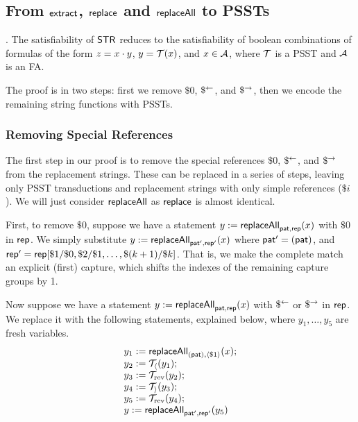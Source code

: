 \subsection{From $\mathsf{extract}$, $\mathsf{replace}$ and $\mathsf{replaceAll}$ to PSSTs}\label{appendix:sec-extract-replace-to-psst}

.
    The satisfiability of $\mathsf{STR}$ reduces to the satisfiability of boolean combinations of formulas of the form $z=x \cdot y$, $y=\mathcal{T}(x)$, and $x \in \mathcal{A}$, where $\mathcal{T}$ is a PSST and $\mathcal{A}$ is an FA.

    The proof is in two steps: first we remove $\$0$, $\$^{\leftarrow}$, and $\$^{\rightarrow}$, then we encode the remaining string functions with PSSTs.

    \subsubsection{Removing Special References}


    The first step in our proof is to remove the special references $\$0$, $\$^{\leftarrow}$, and $\$^{\rightarrow}$ from the replacement strings.
    These can be replaced in a series of steps, leaving only PSST transductions and replacement strings with only simple references ($\$i$).
    We will just consider $\mathsf{replaceAll}$ as $\mathsf{replace}$ is almost identical.

    First, to remove $\$0$, suppose we have a statement
    $y := \mathsf{replaceAll}_{\mathsf{pat}, \mathsf{rep}}(x)$
    with $\$0$ in $\mathsf{rep}$.
    We simply substitute
    $y := \mathsf{replaceAll}_{\mathsf{pat}', \mathsf{rep}'}(x)$
    where
        $\mathsf{pat}' = (\mathsf{pat})$, and
        $\mathsf{rep}' = \mathsf{rep}[\$1 / \$0, \$2 / \$1, \ldots, \$(k+1) / \$k]$.
    That is, we make the complete match an explicit (first) capture, which shifts the indexes of the remaining capture groups by 1.

    Now suppose we have a statement
    $y := \mathsf{replaceAll}_{\mathsf{pat}, \mathsf{rep}}(x)$
    with $\$^{\leftarrow}$ or $\$^{\rightarrow}$ in $\mathsf{rep}$.
    We replace it with the following statements, explained below, where
    $y_1, \ldots, y_5$
    are fresh variables.
    \[
        \begin{array}{l}
            y_1 := \mathsf{replaceAll}_{(\mathsf{pat}), \langle\$1\rangle}(x); \\
            y_2 := \mathcal{T}_{\langle}(y_1); \\
            y_3 := \mathcal{T}_{\mathrm{rev}}(y_2); \\
            y_4 := \mathcal{T}_{\rangle}(y_3); \\
            y_5 := \mathcal{T}_{\mathrm{rev}}(y_4); \\
            y := \mathsf{replaceAll}_{\mathsf{pat}', \mathsf{rep}'}(y_5)
        \end{array}
    \]

